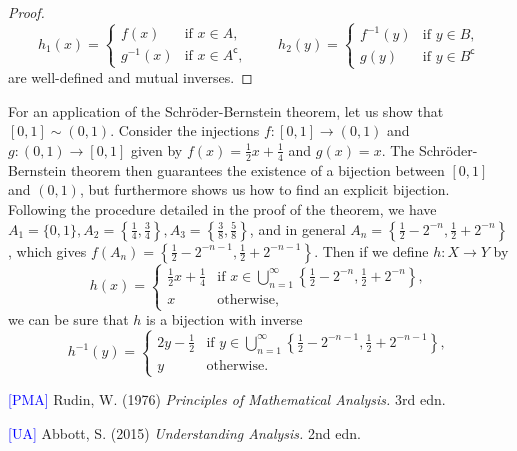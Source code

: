 \documentclass[12pt]{article}
\theoremstyle{definition}
\begin{document}
\begin{proof}
    \[
        h_1(x) = \begin{cases}
            f(x) & \text{if } x \in A, \\
            g^{-1}(x) & \text{if } x \in A^{\mathsf{c}},
        \end{cases}
        \qquad
        h_2(y) = \begin{cases}
            f^{-1}(y) & \text{if } y \in B, \\
            g(y) & \text{if } y \in B^{\mathsf{c}}
        \end{cases}
    \]
    are well-defined and mutual inverses.
\end{proof}

For an application of the Schröder-Bernstein theorem, let us show that \( [0, 1] \sim (0, 1) \). Consider the injections \( f : [0, 1] \to (0, 1) \) and \( g : (0, 1) \to [0, 1] \) given by \( f(x) = \tfrac{1}{2}x + \tfrac{1}{4} \) and \( g(x) = x \). The Schröder-Bernstein theorem then guarantees the existence of a bijection between \( [0, 1] \) and \( (0, 1) \), but furthermore shows us how to find an explicit bijection. Following the procedure detailed in the proof of the theorem, we have \( A_1 = \{ 0, 1 \}, A_2 = \left\{ \tfrac{1}{4}, \tfrac{3}{4} \right\}, A_3 = \left\{ \tfrac{3}{8}, \tfrac{5}{8} \right\} \), and in general \( A_n = \left\{ \tfrac{1}{2} - 2^{-n}, \tfrac{1}{2} + 2^{-n} \right\} \), which gives \( f(A_n) = \left\{ \tfrac{1}{2} - 2^{-n-1}, \tfrac{1}{2} + 2^{-n-1} \right\} \). Then if we define \( h : X \to Y \) by
\[
    h(x) = \begin{cases}
        \tfrac{1}{2}x + \tfrac{1}{4} & \text{if } x \in \bigcup_{n=1}^{\infty} \left\{ \tfrac{1}{2} - 2^{-n}, \tfrac{1}{2} + 2^{-n} \right\}, \\
        x & \text{otherwise},
    \end{cases}
\]
we can be sure that \( h \) is a bijection with inverse
\[
    h^{-1}(y) = \begin{cases}
        2y - \tfrac{1}{2} & \text{if } y \in \bigcup_{n=1}^{\infty} \left\{ \tfrac{1}{2} - 2^{-n-1}, \tfrac{1}{2} + 2^{-n-1} \right\}, \\
        y & \text{otherwise}.
    \end{cases}
\]

\noindent \hrulefill

\noindent \hypertarget{pma}{\textcolor{blue}{[PMA]} Rudin, W. (1976) \textit{Principles of Mathematical Analysis.} 3rd edn.}

\noindent \hypertarget{ua}{\textcolor{blue}{[UA]} Abbott, S. (2015) \textit{Understanding Analysis.} 2nd edn.}
\end{document}
